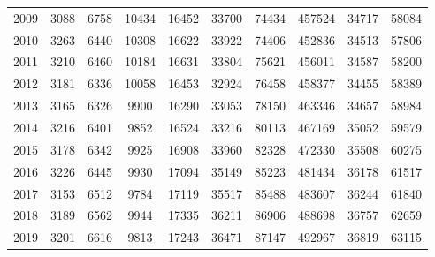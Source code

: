 \begin{table}[H]
\begin{tabular}{|c|ccccccccc|}
  2009 & 3088 & 6758 & 10434 & 16452 & 33700 & 74434 & 457524 & 34717 & 58084 \\ 
  2010 & 3263 & 6440 & 10308 & 16622 & 33922 & 74406 & 452836 & 34513 & 57806 \\ 
  2011 & 3210 & 6460 & 10184 & 16631 & 33804 & 75621 & 456011 & 34587 & 58200 \\ 
  2012 & 3181 & 6336 & 10058 & 16453 & 32924 & 76458 & 458377 & 34455 & 58389 \\ 
  2013 & 3165 & 6326 & 9900 & 16290 & 33053 & 78150 & 463346 & 34657 & 58984 \\ 
  2014 & 3216 & 6401 & 9852 & 16524 & 33216 & 80113 & 467169 & 35052 & 59579 \\ 
  2015 & 3178 & 6342 & 9925 & 16908 & 33960 & 82328 & 472330 & 35508 & 60275 \\ 
  2016 & 3226 & 6445 & 9930 & 17094 & 35149 & 85223 & 481434 & 36178 & 61517 \\ 
  2017 & 3153 & 6512 & 9784 & 17119 & 35517 & 85488 & 483607 & 36244 & 61840 \\ 
  2018 & 3189 & 6562 & 9944 & 17335 & 36211 & 86906 & 488698 & 36757 & 62659 \\ 
  2019 & 3201 & 6616 & 9813 & 17243 & 36471 & 87147 & 492967 & 36819 & 63115 \\ 
   \hline
\end{tabular}
\label{tab:indiana_laborforce}
\end{table}
